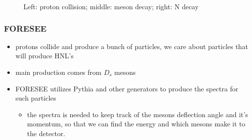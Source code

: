 \documentclass[
	11pt, %
]{beamer}
\begin{document}
\begin{frame}
\begin{figure}
	\vspace*{-1cm}
	 \hspace*{-0cm}
	\caption{Left: proton collision; middle: meson decay; right: N decay}
	\centering
\end{figure}
\end{frame}


\begin{frame}
\frametitle{FORESEE}
	\begin{itemize}
		\item protons collide and produce a bunch of particles, we care about particles that will produce HNL's
		\item main production comes from $D_s$ mesons
		\item FORESEE utilizes Pythia and other generators to produce the spectra for such particles
			\begin{itemize}
				\item the spectra is needed to keep track of the mesons deflection angle and it's momentum, so that we can find the energy and which mesons make it to the detector.
			\end{itemize}
	\end{itemize}





\end{frame}
\end{document}
